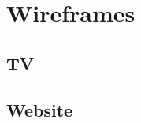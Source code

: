 \documentclass{article}
\begin{document}
\section{Wireframes}
\subsection{TV}

\subsection{Website}
\end{document}

